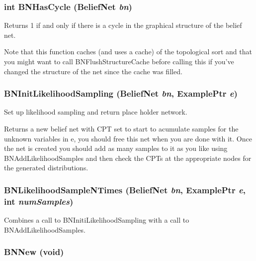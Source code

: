 \subsubsection{\setlength{\rightskip}{0pt plus 5cm}int BNHas\-Cycle ({\bf Belief\-Net} {\em bn})}\label{BeliefNet_8h_a59}


Returns 1 if and only if there is a cycle in the graphical structure of the belief net. 

Note that this function caches (and uses a cache) of the topological sort and that you might want to call BNFlush\-Structure\-Cache before calling this if you've changed the structure of the net since the cache was filled. 
\subsubsection{ BNInit\-Likelihood\-Sampling ({\bf Belief\-Net} {\em bn}, {\bf Example\-Ptr} {\em e})}\label{BeliefNet_8h_a90}


Set up likelihood sampling and return place holder network. 

Returns a new belief net with CPT set to start to acumulate samples for the unknown variables in e, you should free this net when you are done with it. Once the net is created you should add as many samples to it as you like using BNAdd\-Likelihood\-Samples and then check the CPTs at the appropriate nodes for the generated distributions. 
\subsubsection{ BNLikelihood\-Sample\-NTimes ({\bf Belief\-Net} {\em bn}, {\bf Example\-Ptr} {\em e}, int {\em num\-Samples})}\label{BeliefNet_8h_a92}


Combines a call to BNIniti\-Likelihood\-Sampling with a call to BNAdd\-Likelihood\-Samples. 

\subsubsection{ BNNew (void)}\label{BeliefNet_8h_a45}


